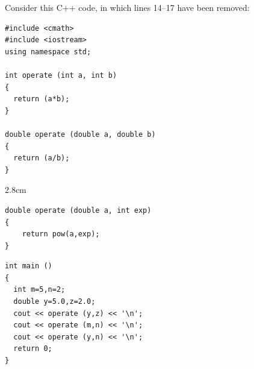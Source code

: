 \question{}

Consider this C++ code, in which lines 14--17 have been removed:


\begin{lstlisting}
#include <cmath>
#include <iostream>
using namespace std;

int operate (int a, int b)
{
  return (a*b);
}

double operate (double a, double b)
{
  return (a/b);
}
\end{lstlisting}

\begin{solutionbox}{2.8cm}
\begin{lstlisting}[firstnumber=14]
double operate (double a, int exp)
{
    return pow(a,exp);
}
\end{lstlisting}
\end{solutionbox}

\begin{lstlisting}[firstnumber=19]
int main ()
{
  int m=5,n=2;
  double y=5.0,z=2.0;
  cout << operate (y,z) << '\n';
  cout << operate (m,n) << '\n';
  cout << operate (y,n) << '\n';
  return 0;
}
\end{lstlisting}

